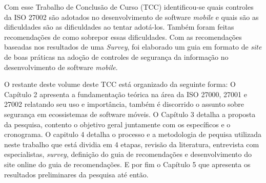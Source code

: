 
Com esse Trabalho de Conclusão de Curso (TCC) identificou-se quais controles da ISO 27002 são adotados no desenvolvimento de software \textit{mobile} e quais são as dificuldades são as dificuldades ao tentar adotá-los.
Também foram feitas recomendações de como sobrepor essas dificuldades. Com as recomendações baseadas nos resultados de uma \textit{Survey}, foi elaborado um guia em formato de \textit{site} de boas práticas na adoção de controles de segurança da informação no desenvolvimento de software \textit{mobile}.

O restante deste volume deste TCC está organizado da seguinte forma: O Capítulo 2 apresenta a fundamentação teórica na área da ISO 27000, 27001 e 27002 relatando seu uso e importância, também é discorrido o assunto sobre segurança em ecossistemas de software móveis. O Capítulo 3 detalha a proposta da pesquisa, contento o objetivo geral juntamente com os específicos e o cronograma. O capitulo 4 detalha o processo e a metodologia de pequisa utilizada neste trabalho que está dividia em 4 etapas, revisão da literatura, entrevista com especialistas, \textit{survey}, definição do guia de recomendações e desenvolvimento do site online do guia de recomendações. E por fim o Capítulo 5 que apresenta os resultados preliminares da pesquisa até então.  







 
